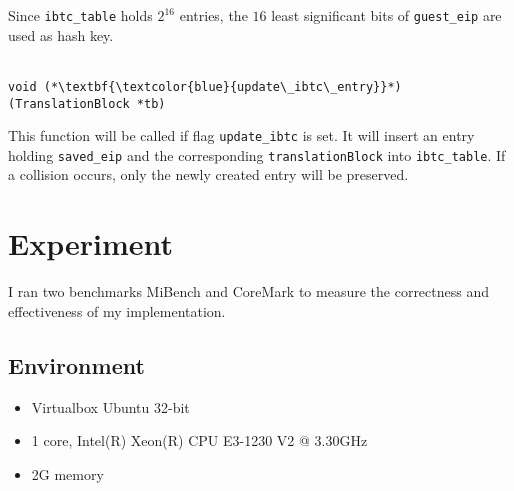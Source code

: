 \documentclass[12pt]{article}
\begin{document}
        Since \verb|ibtc_table| holds $2^{16}$ entries, the $16$ least significant bits of \verb|guest_eip| are used as hash key.
        \\\\
        \begin{lstlisting}[style=Function]
            void (*\textbf{\textcolor{blue}{update\_ibtc\_entry}}*)(TranslationBlock *tb)
        \end{lstlisting}
        This function will be called if flag \verb|update_ibtc| is set. 
        It will insert an entry holding \verb|saved_eip| and the corresponding \verb|translationBlock| into \verb|ibtc_table|. 
        If a collision occurs, only the newly created entry will be preserved.


\section{Experiment}
    I ran two benchmarks MiBench and CoreMark to measure the correctness and effectiveness of my implementation.
    \subsection{Environment}
        \begin{itemize}
            \item Virtualbox Ubuntu 32-bit
            \item 1 core, Intel(R) Xeon(R) CPU E3-1230 V2 @ 3.30GHz
            \item 2G memory
        \end{itemize}
\end{document}
